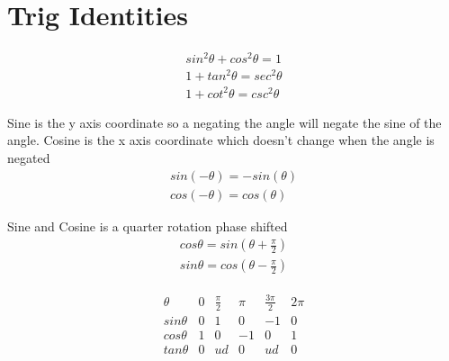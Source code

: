 \documentclass{article}
\theoremstyle{mytheoremstyle}
\theoremstyle{mytheoremstyle}
\theoremstyle{myproblemstyle}
\begin{document}
    \section*{Trig Identities}
    \begin{align*}
        sin^2\theta + cos^2\theta = 1 \\
        1 + tan^2\theta = sec^2\theta \\
        1 + cot^2\theta = csc^2\theta
    \end{align*}


    Sine is the y axis coordinate so a negating the angle will negate the sine
    of the angle. Cosine is the x axis coordinate which doesn't change when the
    angle is negated
    \begin{align*}
        sin(-\theta) = -sin(\theta) \\
        cos(-\theta) = cos(\theta)
    \end{align*}

    Sine and Cosine is a quarter rotation phase shifted
    \begin{align*}
        cos\theta = sin(\theta + \frac{\pi}{2}) \\
        sin\theta = cos(\theta - \frac{\pi}{2})
    \end{align*}

    \begin{align*}
        \begin{matrix}
            \theta & 0 & \frac{\pi}{2} & \pi & \frac{3\pi}{2} & 2\pi \\
            sin\theta & 0 & 1 & 0 & -1 & 0 \\
            cos\theta & 1 & 0 & -1 & 0 & 1 \\
            tan\theta & 0 & ud & 0 & ud & 0
        \end{matrix}
    \end{align*}
\end{document}
